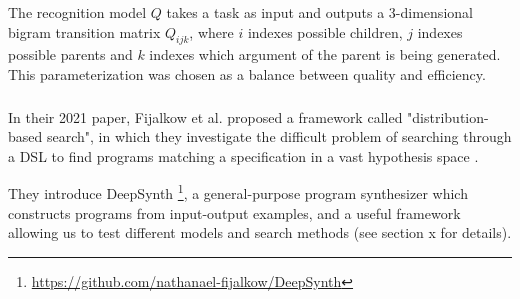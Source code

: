 



The recognition model \(Q\) takes a task as input and outputs a 3-dimensional bigram transition matrix \(Q_{ijk}\), where \(i\) indexes possible children, \(j\) indexes possible parents and \(k\) indexes which argument of the parent is being generated. This parameterization was chosen as a balance between quality and efficiency.
    







\subsubsection{}

In their 2021 paper, Fijalkow et al. proposed a framework called "distribution-based search", in which they investigate the difficult problem of searching through a DSL to find programs matching a specification in a vast hypothesis space \cite{fijalkow_scaling_2021}.

They introduce DeepSynth \footnote{\url{https://github.com/nathanael-fijalkow/DeepSynth}}, a general-purpose program synthesizer which constructs programs from input-output examples, and a useful framework allowing us to test different models and search methods (see section x for details).


